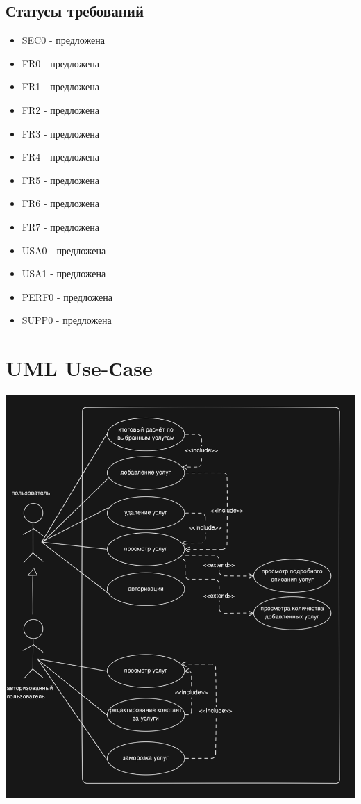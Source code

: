 \documentclass{article}
\begin{document}
\subsection{Статусы требований}
\begin{itemize} 
    \item SEC0 - предложена
    \item FR0 - предложена
    \item FR1 - предложена
    \item FR2 - предложена
    \item FR3 - предложена
    \item FR4 - предложена
    \item FR5 - предложена
    \item FR6 - предложена
    \item FR7 - предложена
    \item USA0 - предложена
    \item USA1 - предложена
    \item PERF0 - предложена
    \item SUPP0 - предложена
\end{itemize}

\section{UML Use-Сase}
\begin{center}
    \includegraphics[width=.9\textwidth]{uml.png}
\end{center}
\end{document}
